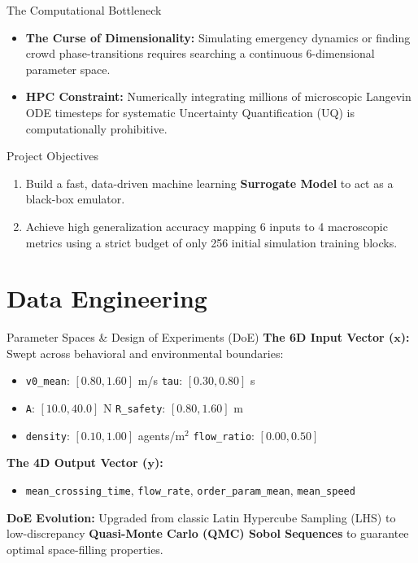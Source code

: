 \documentclass[aspectratio=169]{beamer}
\begin{document}
\begin{frame}{The Computational Bottleneck}
    \begin{itemize}
        \item \textbf{The Curse of Dimensionality:} Simulating emergency dynamics or finding crowd phase-transitions requires searching a continuous 6-dimensional parameter space.
        \item \textbf{HPC Constraint:} Numerically integrating millions of microscopic Langevin ODE timesteps for systematic Uncertainty Quantification (UQ) is computationally prohibitive.
    \end{itemize}

    \vspace{0.4cm}
    \begin{alertblock}{Project Objectives}
        \begin{enumerate}
            \item Build a fast, data-driven machine learning \textbf{Surrogate Model} to act as a black-box emulator.
            \item Achieve high generalization accuracy mapping 6 inputs to 4 macroscopic metrics using a strict budget of only 256 initial simulation training blocks.
        \end{enumerate}
    \end{alertblock}
\end{frame}

\section{Data Engineering}

\begin{frame}{Parameter Spaces \& Design of Experiments (DoE)}
    \textbf{The 6D Input Vector ($\mathbf{x}$):} Swept across behavioral and environmental boundaries:
    \begin{itemize}
        \item \texttt{v0\_mean}: $[0.80, 1.60]$ m/s \quad \texttt{tau}: $[0.30, 0.80]$ s
        \item \texttt{A}: $[10.0, 40.0]$ N \quad \texttt{R\_safety}: $[0.80, 1.60]$ m
        \item \texttt{density}: $[0.10, 1.00]$ agents/m$^2$ \quad \texttt{flow\_ratio}: $[0.00, 0.50]$
    \end{itemize}

    \textbf{The 4D Output Vector ($\mathbf{y}$):}
    \begin{itemize}
        \item \texttt{mean\_crossing\_time}, \texttt{flow\_rate}, \texttt{order\_param\_mean}, \texttt{mean\_speed}
    \end{itemize}

    \vspace{0.3cm}
    \textbf{DoE Evolution:} Upgraded from classic Latin Hypercube Sampling (LHS) to low-discrepancy \textbf{Quasi-Monte Carlo (QMC) Sobol Sequences} to guarantee optimal space-filling properties.
\end{frame}
\end{document}
